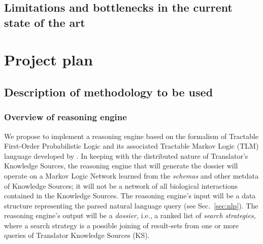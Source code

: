 \documentclass[11pt,notitlepage]{article}
\begin{document}
\subsection{Limitations and bottlenecks in the current state of the art}

\section{Project plan}
\subsection{Description of methodology to be used}
\subsubsection{Overview of reasoning engine}
We propose to implement a reasoning engine based on the formalism of Tractable
First-Order Probabilistic Logic and its associated Tractable Markov Logic (TLM)
language developed by \citet{Domingos:2012wi}. In keeping with the distributed
nature of Translator's Knowledge Sources, the reasoning engine that will
generate the dossier will operate on a Markov Logic Network learned from the
{\em schemas\/} and other metdata of Knowledge Sources; it will not be a network
of all biological interactions contained in the Knowledge Sources. The reasoning
engine's input will be a data structure representing the parsed natural language
query (see Sec.~\ref{sec:nlp}). The reasoning engine's output will be a {\em
  dossier,\/} i.e., a ranked list of {\em search strategies,\/} where a search
strategy is a possible joining of result-sets from one or more queries of
Translator Knowledge Sources (KS).
\end{document}
